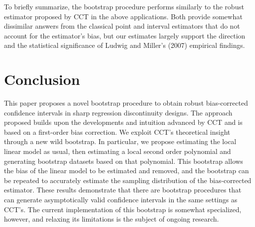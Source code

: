 \documentclass[12pt,fleqn]{article}
\begin{document}
To briefly summarize, the bootstrap procedure performs similarly to the robust
estimator proposed by CCT in the above applications. Both provide somewhat
dissimilar answers from the classical point and interval estimators that do
not account for the estimator's bias, but our estimates largely support the
direction and the statistical significance of Ludwig and Miller's (2007)
empirical findings.

\section{Conclusion}\label{conclusion}

This paper proposes a novel bootstrap procedure to obtain robust bias-corrected
confidence intervals in sharp regression discontinuity designs. The approach proposed builds upon the developments and intuition
advanced by CCT and is based on a first-order bias correction. We exploit CCT's
theoretical insight through a new wild bootstrap. In particular, we propose
estimating the local linear model as usual, then estimating a local second order
polynomial and generating bootstrap datasets based on that
polynomial. This bootstrap allows the bias of the linear model to be estimated
and removed, and the bootstrap can be repeated to accurately estimate the
sampling distribution of the bias-corrected estimator. These results demonstrate
that there are bootstrap procedures that can generate asymptotically valid
confidence intervals in the same settings as CCT's. The current implementation
of this bootstrap is somewhat specialized, however, and relaxing its limitations
is the subject of ongoing research.

\appendix
\end{document}

